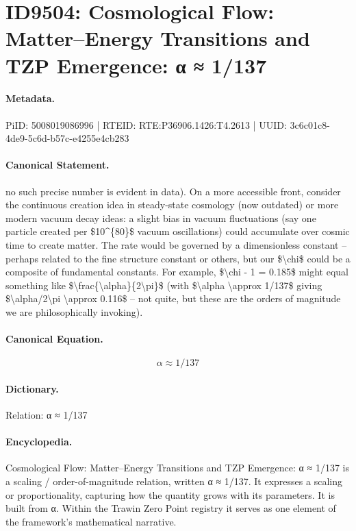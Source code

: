 \section*{ID9504: Cosmological Flow: Matter–Energy Transitions and TZP Emergence: α ≈ 1/137}
\paragraph{Metadata.}
PiID: 5008019086996 | RTEID: RTE:P36906.1426:T4.2613 | UUID: 3c6c01c8-4de9-5c6d-b57c-e4255e4cb283

\paragraph{Canonical Statement.}
no such precise number is evident in data). On a more accessible front, consider the continuous creation idea in steady-state cosmology (now outdated) or more modern vacuum decay ideas: a slight bias in vacuum fluctuations (say one particle created per \$10\textasciicircum{}\{80\}\$ vacuum oscillations) could accumulate over cosmic time to create matter. The rate would be governed by a dimensionless constant – perhaps related to the fine structure constant or others, but our \$\textbackslash{}chi\$ could be a composite of fundamental constants. For example, \$\textbackslash{}chi - 1 = 0.185\$ might equal something like \$\textbackslash{}frac\{\textbackslash{}alpha\}\{2\textbackslash{}pi\}\$ (with \$\textbackslash{}alpha \textbackslash{}approx 1/137\$ giving \$\textbackslash{}alpha/2\textbackslash{}pi \textbackslash{}approx 0.116\$ – not quite, but these are the orders of magnitude we are philosophically invoking).

\paragraph{Canonical Equation.}
\[
\alpha \approx 1/137
\]

\paragraph{Dictionary.}
Relation: α ≈ 1/137

\paragraph{Encyclopedia.}
Cosmological Flow: Matter–Energy Transitions and TZP Emergence: α ≈ 1/137 is a scaling / order-of-magnitude relation, written α ≈ 1/137. It expresses a scaling or proportionality, capturing how the quantity grows with its parameters. It is built from α. Within the Trawin Zero Point registry it serves as one element of the framework's mathematical narrative.
